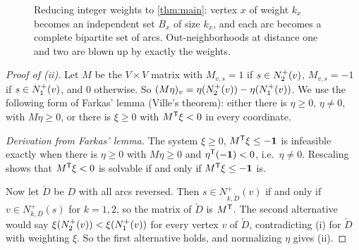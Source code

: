 \begin{figure}[ht]
\centering
{}
\caption{Reducing integer weights to \cref{thm:main}: vertex $x$ of weight
$k_x$ becomes an independent set $B_x$ of size $k_x$, and each arc becomes
a complete bipartite set of arcs. Out-neighborhoods at distance one and
two are blown up by exactly the weights.}
\label{fig:weights}
\end{figure}

\begin{proof}[Proof of \textup{(ii)}]
Let $M$ be the $V\times V$ matrix with $M_{v,s}=1$ if $s\in N^+_2(v)$, $M_{v,s}=-1$ if
$s\in N^+_1(v)$, and $0$ otherwise. So $(M\eta)_v=\eta(N^+_2(v))-\eta(N^+_1(v))$. We use
the following form of Farkas' lemma (Ville's theorem): either there is
$\eta\ge0$, $\eta\ne0$, with $M\eta\ge0$, or there is $\xi\ge0$ with $M^\mathsf T\xi<0$ in every
coordinate.

\emph{Derivation from Farkas' lemma.} The system $\xi\ge0$, $M^\mathsf T\xi\le-\mathbf 1$ is
infeasible exactly when there is $\eta\ge0$ with $M\eta\ge0$ and
$\eta^\mathsf T(-\mathbf 1)<0$, i.e.\ $\eta\ne0$. Rescaling shows that $M^\mathsf T\xi<0$ is
solvable if and only if $M^\mathsf T\xi\le-\mathbf1$ is.

Now let $\overleftarrow D$ be $D$ with all arcs reversed. Then
$s\in N^+_{k,\overleftarrow D}(v)$ if and only if $v\in N^+_{k,D}(s)$ for
$k=1,2$, so the matrix of $\overleftarrow D$ is $M^\mathsf T$. The second alternative
would say $\xi(N^+_2(v))<\xi(N^+_1(v))$ for every vertex $v$ of $\overleftarrow D$,
contradicting (i) for $\overleftarrow D$ with weighting $\xi$. So the first
alternative holds, and normalizing $\eta$ gives (ii).
\end{proof}

